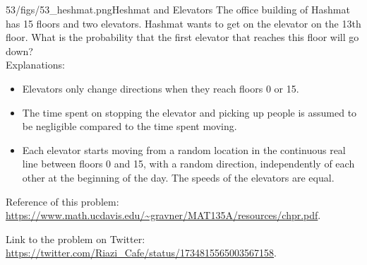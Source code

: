 \begin{problem}{53/figs/53_heshmat.png}{Heshmat and Elevators}  The office building of Hashmat has 15 floors and two elevators. Hashmat wants to get on the elevator on the 13th floor. What is the probability that the first elevator that reaches this floor will go down?\\[0.2cm]
	
Explanations:
\begin{itemize}
	\item Elevators only change directions when they reach floors 0 or 15.
	\item The time spent on stopping the elevator and picking up people is assumed to be negligible compared to the time spent moving.
	\item Each elevator starts moving from a random location in the continuous real line between floors 0 and 15, with a random direction, independently of each other at the beginning of the day. The speeds of the elevators are equal.
\end{itemize}
	
Reference of this problem: \url{https://www.math.ucdavis.edu/~gravner/MAT135A/resources/chpr.pdf}.

Link to the problem on Twitter: \url{https://twitter.com/Riazi_Cafe/status/1734815565003567158}.
\end{problem}
